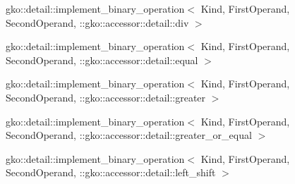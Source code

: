 \begin{DoxyCompactList}
\begin{DoxyCompactList}
\item {}
\end{DoxyCompactList}
\item gko\+:\+:detail\+:\+:implement\+\_\+binary\+\_\+operation$<$ Kind, First\+Operand, Second\+Operand, \+:\+:gko\+:\+:accessor\+:\+:detail\+:\+:div $>$\begin{DoxyCompactList}
\item {}
\end{DoxyCompactList}
\item gko\+:\+:detail\+:\+:implement\+\_\+binary\+\_\+operation$<$ Kind, First\+Operand, Second\+Operand, \+:\+:gko\+:\+:accessor\+:\+:detail\+:\+:equal $>$\begin{DoxyCompactList}
\item {}
\end{DoxyCompactList}
\item gko\+:\+:detail\+:\+:implement\+\_\+binary\+\_\+operation$<$ Kind, First\+Operand, Second\+Operand, \+:\+:gko\+:\+:accessor\+:\+:detail\+:\+:greater $>$\begin{DoxyCompactList}
\item {}
\end{DoxyCompactList}
\item gko\+:\+:detail\+:\+:implement\+\_\+binary\+\_\+operation$<$ Kind, First\+Operand, Second\+Operand, \+:\+:gko\+:\+:accessor\+:\+:detail\+:\+:greater\+\_\+or\+\_\+equal $>$\begin{DoxyCompactList}
\item {}
\end{DoxyCompactList}
\item gko\+:\+:detail\+:\+:implement\+\_\+binary\+\_\+operation$<$ Kind, First\+Operand, Second\+Operand, \+:\+:gko\+:\+:accessor\+:\+:detail\+:\+:left\+\_\+shift $>$\begin{DoxyCompactList}

\end{DoxyCompactList}
\end{DoxyCompactList}
